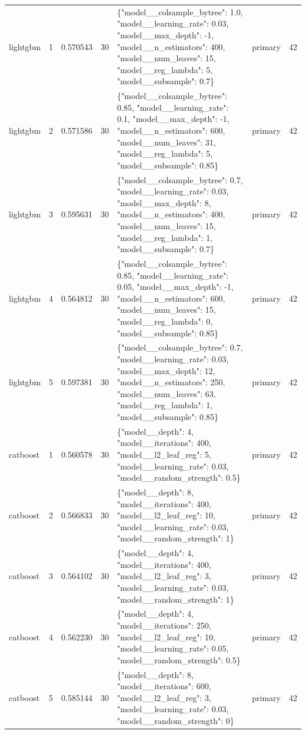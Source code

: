 \begin{tabular}{lrrrllr}
lightgbm & 1 & 0.570543 & 30 & \{"model\_\_colsample\_bytree": 1.0, "model\_\_learning\_rate": 0.03, "model\_\_max\_depth": -1, "model\_\_n\_estimators": 400, "model\_\_num\_leaves": 15, "model\_\_reg\_lambda": 5, "model\_\_subsample": 0.7\} & primary & 42 \\
lightgbm & 2 & 0.571586 & 30 & \{"model\_\_colsample\_bytree": 0.85, "model\_\_learning\_rate": 0.1, "model\_\_max\_depth": -1, "model\_\_n\_estimators": 600, "model\_\_num\_leaves": 31, "model\_\_reg\_lambda": 5, "model\_\_subsample": 0.85\} & primary & 42 \\
lightgbm & 3 & 0.595631 & 30 & \{"model\_\_colsample\_bytree": 0.7, "model\_\_learning\_rate": 0.03, "model\_\_max\_depth": 8, "model\_\_n\_estimators": 400, "model\_\_num\_leaves": 15, "model\_\_reg\_lambda": 1, "model\_\_subsample": 0.7\} & primary & 42 \\
lightgbm & 4 & 0.564812 & 30 & \{"model\_\_colsample\_bytree": 0.85, "model\_\_learning\_rate": 0.05, "model\_\_max\_depth": -1, "model\_\_n\_estimators": 600, "model\_\_num\_leaves": 15, "model\_\_reg\_lambda": 0, "model\_\_subsample": 0.85\} & primary & 42 \\
lightgbm & 5 & 0.597381 & 30 & \{"model\_\_colsample\_bytree": 0.7, "model\_\_learning\_rate": 0.03, "model\_\_max\_depth": 12, "model\_\_n\_estimators": 250, "model\_\_num\_leaves": 63, "model\_\_reg\_lambda": 1, "model\_\_subsample": 0.85\} & primary & 42 \\
catboost & 1 & 0.560578 & 30 & \{"model\_\_depth": 4, "model\_\_iterations": 400, "model\_\_l2\_leaf\_reg": 5, "model\_\_learning\_rate": 0.03, "model\_\_random\_strength": 0.5\} & primary & 42 \\
catboost & 2 & 0.566833 & 30 & \{"model\_\_depth": 8, "model\_\_iterations": 400, "model\_\_l2\_leaf\_reg": 10, "model\_\_learning\_rate": 0.03, "model\_\_random\_strength": 1\} & primary & 42 \\
catboost & 3 & 0.564102 & 30 & \{"model\_\_depth": 4, "model\_\_iterations": 400, "model\_\_l2\_leaf\_reg": 3, "model\_\_learning\_rate": 0.03, "model\_\_random\_strength": 1\} & primary & 42 \\
catboost & 4 & 0.562230 & 30 & \{"model\_\_depth": 4, "model\_\_iterations": 250, "model\_\_l2\_leaf\_reg": 10, "model\_\_learning\_rate": 0.05, "model\_\_random\_strength": 0.5\} & primary & 42 \\
catboost & 5 & 0.585144 & 30 & \{"model\_\_depth": 8, "model\_\_iterations": 600, "model\_\_l2\_leaf\_reg": 3, "model\_\_learning\_rate": 0.03, "model\_\_random\_strength": 0\} & primary & 42 \\

\end{tabular}

